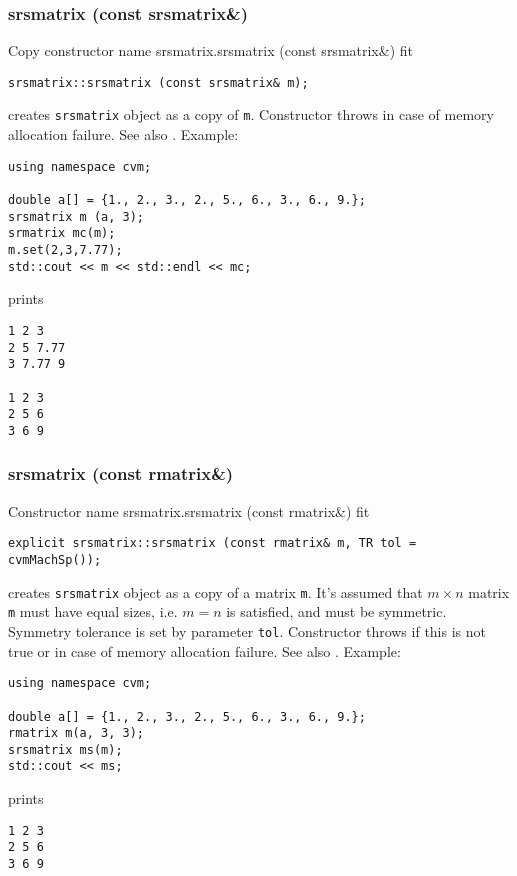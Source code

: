 \subsubsection{srsmatrix (const srsmatrix\&)}
Copy constructor%
\pdfdest name {srsmatrix.srsmatrix (const srsmatrix&)} fit
\begin{verbatim}
srsmatrix::srsmatrix (const srsmatrix& m);
\end{verbatim}
creates  \verb"srsmatrix" object as a copy of \verb"m".
Constructor throws  
in case of memory allocation failure.
See also .
Example:
\begin{Verbatim}
using namespace cvm;

double a[] = {1., 2., 3., 2., 5., 6., 3., 6., 9.};
srsmatrix m (a, 3);
srmatrix mc(m);
m.set(2,3,7.77);
std::cout << m << std::endl << mc;
\end{Verbatim}
prints
\begin{Verbatim}
1 2 3
2 5 7.77
3 7.77 9

1 2 3
2 5 6
3 6 9
\end{Verbatim}
\newpage



\subsubsection{srsmatrix (const rmatrix\&)}
Constructor%
\pdfdest name {srsmatrix.srsmatrix (const rmatrix&)} fit
\begin{verbatim}
explicit srsmatrix::srsmatrix (const rmatrix& m, TR tol = cvmMachSp());
\end{verbatim}
creates  \verb"srsmatrix" object as a copy of a matrix \verb"m".
It's assumed that $m\times n$ matrix \verb"m" must have equal
sizes, i.e. $m = n$ is satisfied, and must be symmetric.
Symmetry tolerance is set by parameter \verb'tol'.
Constructor throws  
if this is not true or in case of memory allocation failure.
See also .
Example:
\begin{Verbatim}
using namespace cvm;

double a[] = {1., 2., 3., 2., 5., 6., 3., 6., 9.};
rmatrix m(a, 3, 3);
srsmatrix ms(m);
std::cout << ms;
\end{Verbatim}
prints
\begin{Verbatim}
1 2 3
2 5 6
3 6 9
\end{Verbatim}
\newpage



